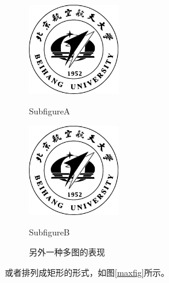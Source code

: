 \begin{figure}[htb]
\begin{minipage}{0.5\textwidth}
    \centering
    \includegraphics[width=0.35\textwidth]{figure/buaamark.eps}
    \caption{SubfigureA}
    \label{minifiga}
\end{minipage}
\begin{minipage}{0.5\textwidth}
    \centering
    \includegraphics[width=0.35\textwidth]{figure/buaamark.eps}
    \caption{SubfigureB}
    \label{minifigb}
\end{minipage}
\caption{另外一种多图的表现}
\end{figure}
或者排列成矩形的形式，如图\ref{maxfig}所示。\par
